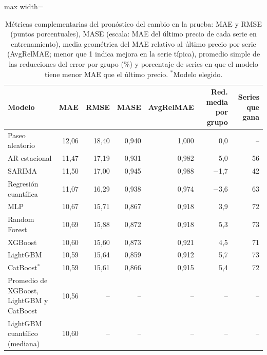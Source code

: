 \begin{table}[htbp]\centering\small
\caption{Métricas complementarias del pronóstico del cambio en la prueba: MAE y RMSE (puntos porcentuales), MASE (escala: MAE del último precio de cada serie en entrenamiento), media geométrica del MAE relativo al último precio por serie (AvgRelMAE; menor que 1 indica mejora en la serie típica), promedio simple de las reducciones del error por grupo (\%) y porcentaje de series en que el modelo tiene menor MAE que el último precio. $^\ast$Modelo elegido.}\label{tab:reg_extra}
\begin{adjustbox}{max width=\textwidth}\begin{tabular}{lrrrrrr}\toprule
Modelo & MAE & RMSE & MASE & AvgRelMAE & Red. media por grupo & Series que gana\\ \midrule
Paseo aleatorio & 12{,}06 & 18{,}40 & 0{,}940 & 1{,}000 & 0{,}0 & -- \\
AR estacional & 11{,}47 & 17{,}19 & 0{,}931 & 0{,}982 & 5{,}0 & 56 \\
SARIMA & 11{,}50 & 17{,}00 & 0{,}945 & 0{,}988 & \ensuremath{-}1{,}7 & 42 \\
\midrule
Regresión cuantílica & 11{,}07 & 16{,}29 & 0{,}938 & 0{,}974 & \ensuremath{-}3{,}6 & 63 \\
MLP & 10{,}67 & 15{,}71 & 0{,}867 & 0{,}918 & 3{,}9 & 72 \\
Random Forest & 10{,}69 & 15{,}88 & 0{,}872 & 0{,}918 & 5{,}3 & 73 \\
XGBoost & 10{,}60 & 15{,}60 & 0{,}873 & 0{,}921 & 4{,}5 & 71 \\
LightGBM & 10{,}59 & 15{,}64 & 0{,}859 & 0{,}912 & 5{,}7 & 73 \\
CatBoost$^\ast$ & 10{,}59 & 15{,}61 & 0{,}866 & 0{,}915 & 5{,}4 & 72 \\
\midrule
Promedio de XGBoost, LightGBM y CatBoost & 10{,}56 & -- & -- & -- & -- & -- \\
LightGBM cuantílico (mediana) & 10{,}60 & -- & -- & -- & -- & -- \\
\bottomrule\end{tabular}\end{adjustbox}\end{table}
